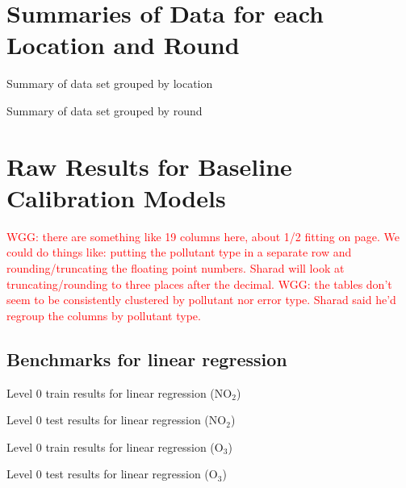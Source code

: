 \documentclass[journal abbreviation, manuscript]{copernicus}
\newcommand\todo[1]{\textcolor{red}{#1}}
\newcommand{\textus}[1]{$_{\text{#1}}$}
\begin{document}
\section{Summaries of Data for each Location and Round}
\label{sec:summaryresults}

\begin{table}[H]
\scriptsize

\caption{Summary of data set grouped by location}
\label{tab:locationsummary}
\end{table}

\begin{table}[H]
\scriptsize

\caption{Summary of data set grouped by round}
\label{tab:roundsummary}
\end{table}

\section{Raw Results for Baseline Calibration Models}
\label{sec:simpleresults}
\todo{WGG: there are something like 19 columns here, about 1/2 fitting on page.  We could do things like: putting the pollutant type in a separate row and rounding/truncating the floating point numbers.  Sharad will look at truncating/rounding to three places after the decimal.}
\todo{WGG: the tables don't seem to be consistently clustered by pollutant nor error type.  Sharad said he'd regroup the columns by pollutant type.}

\subsection{Benchmarks for linear regression}
\label{sec:results-lr}

\begin{table}[H]
\centering
\scriptsize

\caption{Level 0 train results for linear regression (NO\textus{2})}
\end{table}
\begin{table}[H]
\centering
\scriptsize

\caption{Level 0 test results for linear regression (NO\textus{2})}
\end{table}

\begin{table}[H]
\centering
\scriptsize

\caption{Level 0 train results for linear regression (O\textus{3})}
\end{table}
\begin{table}[H]
\centering
\scriptsize

\caption{Level 0 test results for linear regression (O\textus{3})}
\end{table}
\end{document}
